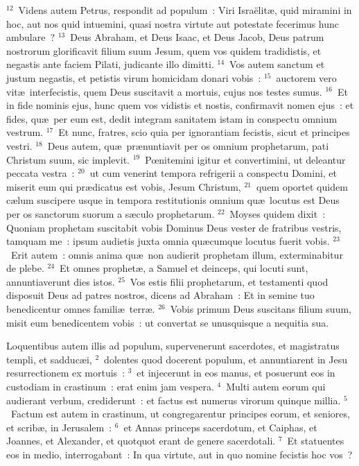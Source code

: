 ${}^{12}$~Videns autem Petrus, respondit ad populum~: Viri Isra\"elit\ae , quid miramini in hoc, aut nos quid intuemini, quasi nostra virtute aut potestate fecerimus hunc ambulare~?
${}^{13}$~Deus Abraham, et Deus Isaac, et Deus Jacob, Deus patrum nostrorum glorificavit filium suum Jesum, quem vos quidem tradidistis, et negastis ante faciem Pilati, judicante illo dimitti.
${}^{14}$~Vos autem sanctum et justum negastis, et petistis virum homicidam donari vobis~:
${}^{15}$~auctorem vero vit\ae\ interfecistis, quem Deus suscitavit a mortuis, cujus nos testes sumus.
${}^{16}$~Et in fide nominis ejus, hunc quem vos vidistis et nostis, confirmavit nomen ejus~: et fides, qu\ae\ per eum est, dedit integram sanitatem istam in conspectu omnium vestrum.
${}^{17}$~Et nunc, fratres, scio quia per ignorantiam fecistis, sicut et principes vestri.
${}^{18}$~Deus autem, qu\ae\ pr\ae nuntiavit per os omnium prophetarum, pati Christum suum, sic implevit.
${}^{19}$~Pœnitemini igitur et convertimini, ut deleantur peccata vestra~:
${}^{20}$~ut cum venerint tempora refrigerii a conspectu Domini, et miserit eum qui pr\ae dicatus est vobis, Jesum Christum,
${}^{21}$~quem oportet quidem c\ae lum suscipere usque in tempora restitutionis omnium qu\ae\ locutus est Deus per os sanctorum suorum a s\ae culo prophetarum.
${}^{22}$~Moyses quidem dixit~: Quoniam prophetam suscitabit vobis Dominus Deus vester de fratribus vestris, tamquam me~: ipsum audietis juxta omnia qu\ae cumque locutus fuerit vobis.
${}^{23}$~Erit autem~: omnis anima qu\ae\ non audierit prophetam illum, exterminabitur de plebe.
${}^{24}$~Et omnes prophet\ae , a Samuel et deinceps, qui locuti sunt, annuntiaverunt dies istos.
${}^{25}$~Vos estis filii prophetarum, et testamenti quod disposuit Deus ad patres nostros, dicens ad Abraham~: Et in semine tuo benedicentur omnes famili\ae\ terr\ae .
${}^{26}$~Vobis primum Deus suscitans filium suum, misit eum benedicentem vobis~: ut convertat se unusquisque a nequitia sua.

\lettrine[lines=3,image=true,loversize=0.05,lraise=-0.03]{L}{}oquentibus autem illis ad populum, supervenerunt sacerdotes, et magistratus templi, et sadduc\ae i,
${}^{2}$~dolentes quod docerent populum, et annuntiarent in Jesu resurrectionem ex mortuis~:
${}^{3}$~et injecerunt in eos manus, et posuerunt eos in custodiam in crastinum~: erat enim jam vespera.
${}^{4}$~Multi autem eorum qui audierant verbum, crediderunt~: et factus est numerus virorum quinque millia.
${}^{5}$~Factum est autem in crastinum, ut congregarentur principes eorum, et seniores, et scrib\ae , in Jerusalem~:
${}^{6}$~et Annas princeps sacerdotum, et Caiphas, et Joannes, et Alexander, et quotquot erant de genere sacerdotali.
${}^{7}$~Et statuentes eos in medio, interrogabant~: In qua virtute, aut in quo nomine fecistis hoc vos~?


